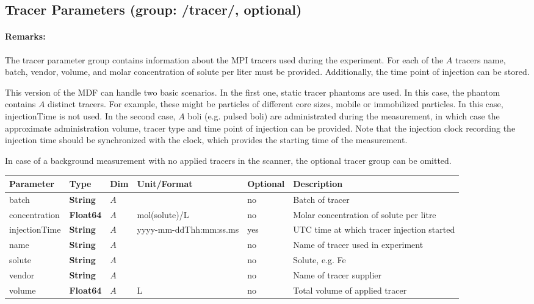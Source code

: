 \documentclass[landscape,a4paper]{article} %
\newcommand{\inltab}[1]{{\ttfamily\bfseries\color{blue}#1}}
\newcommand{\inlvar}[1]{{\ttfamily#1}}
\begin{document}
\subsection{Tracer Parameters (group: \inlvar{/tracer/}, optional)}

\begin{multicols}{2}
\paragraph{Remarks:} The tracer parameter group contains information about the MPI tracers used during the experiment. For each of the $A$ tracers \inlvar{name}, \inlvar{batch}, \inlvar{vendor}, \inlvar{volume},  and molar \inlvar{concentration} of \inlvar{solute} per liter must be provided. Additionally, the time point of injection can be stored.

This version of the MDF can handle two basic scenarios. In the first one, static tracer phantoms are used. In this case, the phantom contains $A$ distinct tracers. For example, these might be particles of different core sizes, mobile or immobilized particles. In this case, \inlvar{injectionTime} is not used. In the second case, $A$ boli (e.g. pulsed boli) are administrated during the measurement, in which case the approximate administration volume, tracer type and time point of injection can be provided. Note that the injection clock recording the injection time should be synchronized with the clock, which provides the starting time of the measurement.

In case of a background measurement with no applied tracers in the scanner, the optional tracer group can be omitted.
\end{multicols}

\noindent \begin{tabularx}{\columnwidth}{lllllX} 
\textbf{Parameter} & \textbf{Type} & \textbf{Dim} & \textbf{Unit/Format} & \textbf{Optional} & \textbf{Description} \\ \hline 
\inlvar{batch} & \inltab{String} & $A$ & & no & Batch of tracer \\ \hline
\inlvar{concentration} & \inltab{Float64} & $A$ & mol(\inlvar{solute})/L & no & Molar concentration of \inlvar{solute} per litre \\ \hline
\inlvar{injectionTime} & \inltab{String} & $A$ & yyyy-mm-ddThh:mm:ss.ms & yes & UTC time at which tracer injection started \\ \hline
\inlvar{name} & \inltab{String} & $A$ & & no & Name of tracer used in experiment \\ \hline
\inlvar{solute} & \inltab{String} & $A$ & & no & Solute, e.g. Fe \\ \hline
\inlvar{vendor} & \inltab{String} & $A$ & & no & Name of tracer supplier \\ \hline
\inlvar{volume} & \inltab{Float64} & $A$ & L & no & Total volume of applied tracer \\ \hline
\end{tabularx}
\end{document}

